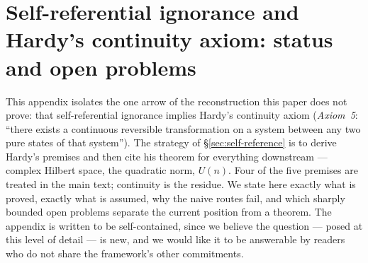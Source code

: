 %
%

\section{Self-referential ignorance and Hardy's continuity axiom: status and open problems}
\label{app:continuity-open}

This appendix isolates the one arrow of the reconstruction this paper does not prove:
that self-referential ignorance implies Hardy's continuity axiom \cite{hardy2001}
(\emph{Axiom~5}: ``there exists a continuous reversible transformation on a system between
any two pure states of that system''). The strategy of \S\ref{sec:self-reference} is to
derive Hardy's premises and then cite his theorem for everything downstream --- complex
Hilbert space, the quadratic norm, $U(n)$. Four of the five premises are treated in the
main text; continuity is the residue. We state here exactly what is proved, exactly what
is assumed, why the naive routes fail, and which sharply bounded open problems separate
the current position from a theorem. The appendix is written to be self-contained, since
we believe the question --- posed at this level of detail --- is new, and we would like it
to be answerable by readers who do not share the framework's other commitments.

